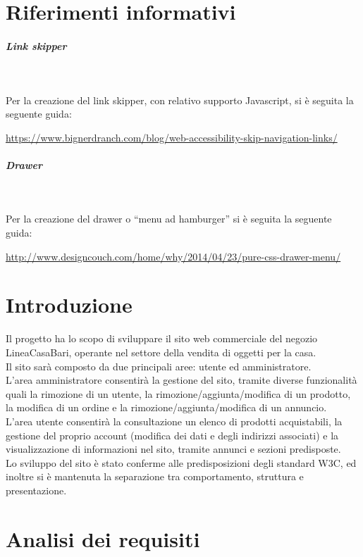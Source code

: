




\makeFrontPage
\clearpage
\tableofcontents
\clearpage

\section{Riferimenti informativi}
	\subparagraph{Link skipper}~
	
	Per la creazione del link skipper, con relativo supporto Javascript, si è seguita la seguente guida:
	\begin{center}
		\url{https://www.bignerdranch.com/blog/web-accessibility-skip-navigation-links/}
	\end{center}
	
	\subparagraph{Drawer}~
	
	Per la creazione del drawer o ``menu ad hamburger'' si è seguita la seguente guida:
	\begin{center}
		\url{http://www.designcouch.com/home/why/2014/04/23/pure-css-drawer-menu/}
	\end{center}

\section{Introduzione}
Il progetto ha lo scopo di sviluppare il sito web commerciale del negozio LineaCasaBari, operante nel settore della vendita di oggetti per la casa. \\
Il sito sarà composto da due principali aree: utente ed amministratore. \\
L'area amministratore consentirà la gestione del sito, tramite diverse funzionalità quali la rimozione di un utente, la rimozione/aggiunta/modifica di un prodotto, la modifica di un ordine e la rimozione/aggiunta/modifica di un annuncio. \\
L'area utente consentirà la consultazione un elenco di prodotti acquistabili, la gestione del proprio account (modifica dei dati e degli indirizzi associati) e la visualizzazione di informazioni nel sito, tramite annunci e sezioni predisposte. \\
Lo sviluppo del sito è stato conferme alle predisposizioni degli standard W3C, ed inoltre si è mantenuta la separazione tra comportamento, struttura e presentazione.

\section{Analisi dei requisiti} %
